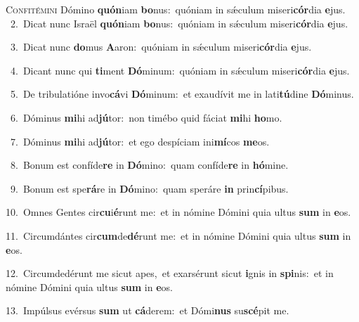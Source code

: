\lettrine{\initial\textcolor{\initialcolor}{C}}{onfitémini} Dómino \textbf{quón}\-iam \textbf{bo}\-nus:~\star quóniam in sǽculum miseri\-\textbf{cór}\-dia \textbf{e}\-jus.\\
{\numbfont\textcolor{\numbcolor}{~2.}}~Dicat nunc Israël \textbf{quón}\-iam \textbf{bo}\-nus:~\star quóniam in sǽculum miseri\-\textbf{cór}\-dia \textbf{e}\-jus.\par
{\numbfont\textcolor{\numbcolor}{~3.}}~Dicat nunc \textbf{do}\-mus \textbf{A}\-aron:~\star quóniam in sǽculum miseri\-\textbf{cór}\-dia \textbf{e}\-jus.\par
{\numbfont\textcolor{\numbcolor}{~4.}}~Dicant nunc qui \textbf{ti}\-ment \textbf{Dó}\-minum:~\star quóniam in sǽculum miseri\-\textbf{cór}\-dia \textbf{e}\-jus.\par
{\numbfont\textcolor{\numbcolor}{~5.}}~De tribulatióne invo\-\textbf{cá}\-vi \textbf{Dó}\-minum:~\star et exaudívit me in lati\-\textbf{tú}\-dine \textbf{Dó}\-minus.\par
{\numbfont\textcolor{\numbcolor}{~6.}}~Dóminus \textbf{mi}\-hi ad\-\textbf{jú}\-tor:~\star non timébo quid fáciat \textbf{mi}\-hi \textbf{ho}\-mo.\par
{\numbfont\textcolor{\numbcolor}{~7.}}~Dóminus \textbf{mi}\-hi ad\-\textbf{jú}\-tor:~\star et ego despíciam ini\-\textbf{mí}\-cos \textbf{me}\-os.\par
{\numbfont\textcolor{\numbcolor}{~8.}}~Bonum est confíde\textbf{re} in \textbf{Dó}\-mino:~\star quam confíde\textbf{re} in \textbf{hó}\-mine.\par
{\numbfont\textcolor{\numbcolor}{~9.}}~Bonum est spe\-\textbf{rá}\-re in \textbf{Dó}\-mino:~\star quam speráre \textbf{in} prin\-\textbf{cí}\-pibus.\par
{\numbfont\textcolor{\numbcolor}{10.}}~Omnes Gentes cir\-\textbf{cu}\-i\-\textbf{é}\-runt me:~\star et in nómine Dómini quia ultus \textbf{sum} in \textbf{e}\-os.\par
{\numbfont\textcolor{\numbcolor}{11.}}~Circumdántes cir\-\textbf{cum}\-de\-\textbf{dé}\-runt me:~\star et in nómine Dómini quia ultus \textbf{sum} in \textbf{e}\-os.\par
{\numbfont\textcolor{\numbcolor}{12.}}~Circumdedérunt me sicut apes,~\dagger et exarsérunt sicut \textbf{i}\-gnis in \textbf{spi}\-nis:~\star et in nómine Dómini quia ultus \textbf{sum} in \textbf{e}\-os.\par
{\numbfont\textcolor{\numbcolor}{13.}}~Impúlsus evérsus \textbf{sum} ut \textbf{cá}\-derem:~\star et Dómi\textbf{nus} su\-\textbf{scé}\-pit me.\par
